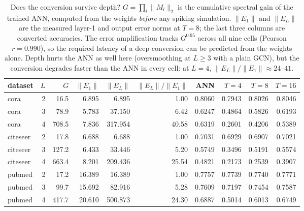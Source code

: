 \begin{table}[t]
\centering
\footnotesize
\caption{Does the conversion survive depth? $G=\prod_l\|M_l\|_2$ is the cumulative spectral
gain of the trained ANN, computed from the weights \emph{before} any spiking simulation.
$\|E_1\|$ and $\|E_L\|$ are the measured layer-1 and output error norms at $T=8$; the last three
columns are converted accuracies. The error amplification tracks $G^{0.95}$ across all nine
cells (Pearson $r=0.990$), so the required latency
of a deep conversion can be predicted from the weights alone. Depth hurts the ANN as well here
(oversmoothing at $L\ge3$ with a plain GCN), but the conversion degrades faster than the ANN in
every cell: at $L=4$, $\|E_L\|/\|E_1\|\approx24$--$41$.}
\label{tab:depth}
\begin{tabular}{lrrrrrrrrr}
\toprule
dataset & $L$ & $G$ & $\|E_1\|$ & $\|E_L\|$ & $\|E_L\|/\|E_1\|$ & ANN & $T{=}4$ & $T{=}8$ & $T{=}16$ \\
\midrule
cora & 2 & 16.5 & 6.895 & 6.895 & 1.00 & 0.8060 & 0.7943 & 0.8026 & 0.8046 \\
cora & 3 & 78.9 & 5.783 & 37.150 & 6.42 & 0.6247 & 0.4864 & 0.5826 & 0.6193 \\
cora & 4 & 708.5 & 7.836 & 317.954 & 40.58 & 0.6319 & 0.2601 & 0.4206 & 0.5389 \\
citeseer & 2 & 17.8 & 6.688 & 6.688 & 1.00 & 0.7031 & 0.6929 & 0.6907 & 0.7021 \\
citeseer & 3 & 127.2 & 6.433 & 33.446 & 5.20 & 0.5749 & 0.3496 & 0.5191 & 0.5574 \\
citeseer & 4 & 663.4 & 8.201 & 209.436 & 25.54 & 0.4821 & 0.2173 & 0.2539 & 0.3907 \\
pubmed & 2 & 17.2 & 16.389 & 16.389 & 1.00 & 0.7757 & 0.7739 & 0.7740 & 0.7771 \\
pubmed & 3 & 99.7 & 15.692 & 82.916 & 5.28 & 0.7609 & 0.7197 & 0.7454 & 0.7587 \\
pubmed & 4 & 417.7 & 20.610 & 500.873 & 24.30 & 0.6887 & 0.5014 & 0.6013 & 0.6749 \\
\bottomrule
\end{tabular}
\end{table}
